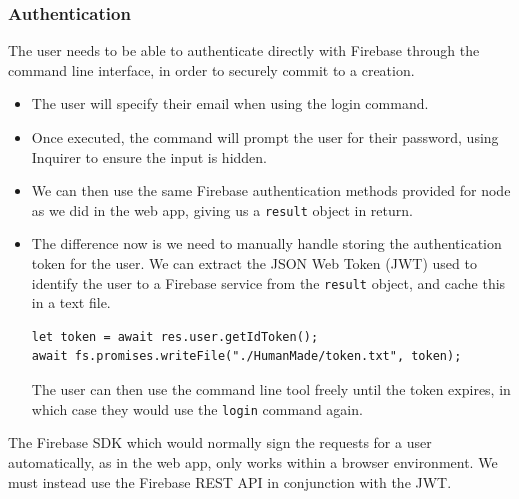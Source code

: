 \documentclass[12pt,a4paper]{article}
\begin{document}
\subsubsection{Authentication}
The user needs to be able to authenticate directly with Firebase through the command line interface, in order to securely commit to a creation.
\begin{itemize}
    \item The user will specify their email when using the login command.
    \item Once executed, the command will prompt the user for their password, using Inquirer to ensure the input is hidden.
    \item We can then use the same Firebase authentication methods provided for node as we did in the web app, giving us a \verb|result| object in return.
    \item The difference now is we need to manually handle storing the authentication token for the user. We can extract the JSON Web Token (JWT) used to identify the user to a Firebase service from the \verb|result| object, and cache this in a text file. 
    \begin{lstlisting}
let token = await res.user.getIdToken();
await fs.promises.writeFile("./HumanMade/token.txt", token);
    \end{lstlisting}
    The user can then use the command line tool freely until the token expires, in which case they would use the \verb|login| command again. 
\end{itemize}
The Firebase SDK which would normally sign the requests for a user automatically, as in the web app, only works within a browser environment. We must instead use the Firebase REST API in conjunction with the JWT.
\end{document}
